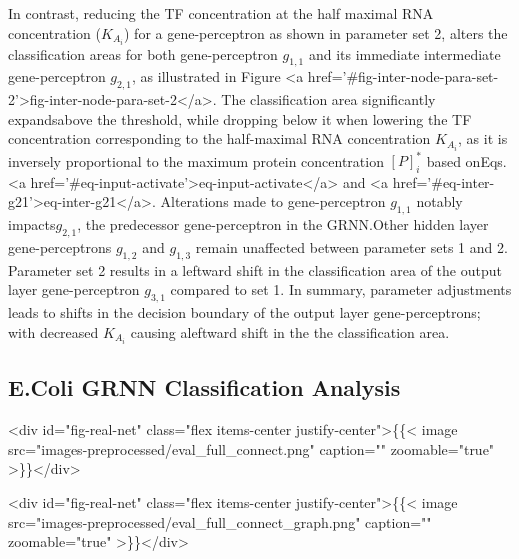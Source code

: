 \documentclass[twocolumn]{biophys-new}
\begin{document}
{{In contrast, reducing the TF concentration at the half maximal RNA concentration ($K_{A_i}$) for a gene-perceptron as shown in parameter set 2, alters the classification areas for both gene-perceptron $g_{1,1}$ and its immediate intermediate gene-perceptron $g_{2,1}$, as illustrated in Figure <a href='#fig-inter-node-para-set-2'>fig-inter-node-para-set-2</a>. 
The classification area significantly expandsabove the threshold, while dropping below it when lowering the TF concentration corresponding to the half-maximal RNA concentration $K_{A_i}$, as it is inversely proportional to the maximum protein concentration $[P]^*_i$ based onEqs. <a href='#eq-input-activate'>eq-input-activate</a> and <a href='#eq-inter-g21'>eq-inter-g21</a>. Alterations made to gene-perceptron $g_{1,1}$ notably impacts$g_{2,1}$, the predecessor gene-perceptron in the GRNN.Other hidden layer gene-perceptrons $g_{1,2}$ and $g_{1,3}$ remain unaffected between parameter sets 1 and 2. Parameter set 2 results in a leftward shift in the classification area of the output layer gene-perceptron $g_{3,1}$ compared to set 1. 
In summary, parameter adjustments leads to shifts in the decision boundary of the output layer gene-perceptrons; with decreased $K_{A_i}$ causing aleftward shift in the the classification area. 
\vspace{-0.5em}
\subsection{E.Coli GRNN Classification Analysis}
<div id="fig-real-net" class="flex items-center justify-center">\{\{< image src="images-preprocessed/eval_full_connect.png" caption="" zoomable="true" >\}\}</div>


<div id="fig-real-net" class="flex items-center justify-center">\{\{< image src="images-preprocessed/eval_full_connect_graph.png" caption="" zoomable="true" >\}\}</div>


}}
\end{document}
